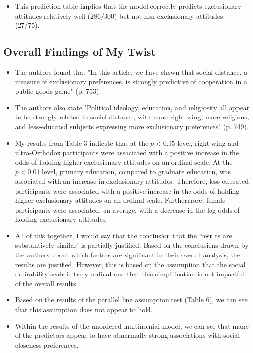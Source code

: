 \documentclass[12pt,letterpaper]{article}
\begin{document}
\begin{itemize}
	\item This prediction table implies that the model correctly predicts exclusionary attitudes relatively well (286/300) but not non-exclusionary attitudes (27/75).
\end{itemize}



\subsection{Overall Findings of My Twist}

\begin{itemize}
	\item The authors found that "In this article, we have shown that social distance, a measure of exclusionary preferences, is strongly predictive of cooperation in a public goods game" (p. 753).
	\item The authors also state "Political ideology, education, and religiosity all appear to be strongly related to social distance, with more right-wing, more religious, and less-educated subjects expressing more exclusionary preferences" (p. 749).
	\item My results from Table 3 indicate that at the $p < 0.05$ level, right-wing and ultra-Orthodox participants were associated with a positive increase in the odds of holding higher exclusionary attitudes on an ordinal scale. At the $p < 0.01$ level, primary education, compared to graduate education, was associated with an increase in exclusionary attitudes. Therefore, less educated participants were associated with a positive increase in the odds of holding higher exclusionary attitudes on an ordinal scale. Furthermore, female participants were associated, on average, with a decrease in the log odds of holding exclusionary attitudes.
	\item All of this together, I would say that the conclusion that the 'results are substantively similar' is partially justified. Based on the conclusions drawn by the authors about which factors are significant in their overall analysis, the results are justified. However, this is based on the assumption that the social desirability scale is truly ordinal and that this simplification is not impactful of the overall results.
	\item Based on the results of the parallel line assumption test (Table 6), we can see that this assumption does not appear to hold.
	\item Within the results of the unordered multinomial model, we can see that many of the predictors appear to have abnormally strong associations with social closeness preferences. 

\end{itemize}
\end{document}
